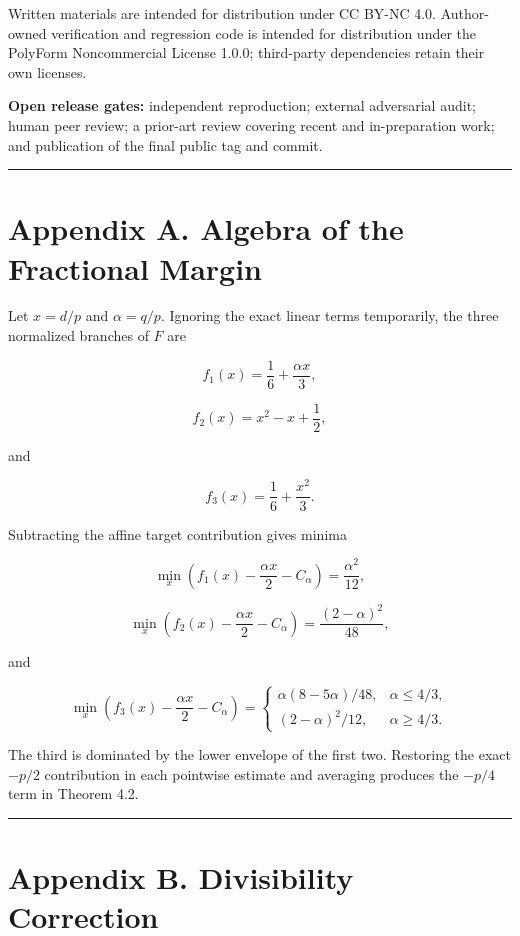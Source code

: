 \documentclass[
  american,
  11pt,
  a4paper,
]{article}
\begin{document}
Written materials are intended for distribution under CC BY-NC 4.0. Author-owned verification and regression code is intended for distribution under the PolyForm Noncommercial License 1.0.0; third-party dependencies retain their own licenses.

\textbf{Open release gates:} independent reproduction; external adversarial audit; human peer review; a prior-art review covering recent and in-preparation work; and publication of the final public tag and commit.

\begin{center}\rule{0.5\linewidth}{0.5pt}\end{center}

\section{Appendix A. Algebra of the Fractional Margin}\label{appendix-a.-algebra-of-the-fractional-margin}

Let \(x=d/p\) and \(\alpha=q/p\). Ignoring the exact linear terms temporarily, the three normalized branches of \(F\) are

\[
f_1(x)=\frac16+\frac{\alpha x}{3},
\]

\[
f_2(x)=x^2-x+\frac12,
\]

and

\[
f_3(x)=\frac16+\frac{x^2}{3}.
\]

Subtracting the affine target contribution gives minima

\[
\min_x\left(f_1(x)-\frac{\alpha x}{2}-C_\alpha\right)
=
\frac{\alpha^2}{12},
\]

\[
\min_x\left(f_2(x)-\frac{\alpha x}{2}-C_\alpha\right)
=
\frac{(2-\alpha)^2}{48},
\]

and

\[
\min_x\left(f_3(x)-\frac{\alpha x}{2}-C_\alpha\right)
=
\begin{cases}
\alpha(8-5\alpha)/48,&\alpha\le4/3,\\
(2-\alpha)^2/12,&\alpha\ge4/3.
\end{cases}
\]

The third is dominated by the lower envelope of the first two. Restoring the exact \(-p/2\) contribution in each pointwise estimate and averaging produces the \(-p/4\) term in Theorem 4.2.

\begin{center}\rule{0.5\linewidth}{0.5pt}\end{center}

\section{Appendix B. Divisibility Correction}\label{appendix-b.-divisibility-correction}
\end{document}
